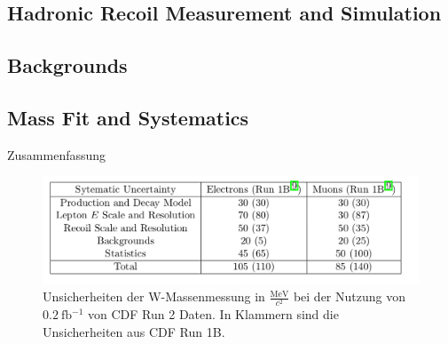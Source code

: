 \documentclass[aspectratio=1610, 9pt]{beamer}
\begin{document}
\subsection{Hadronic Recoil Measurement and Simulation}

\begin{frame}{}

\end{frame}

\subsection{Backgrounds}

\begin{frame}{}

\end{frame}

\subsection{Mass Fit and Systematics}

\begin{frame}{}

\end{frame}

\begin{frame}{Zusammenfassung}
  \begin{figure}
    \includegraphics[width=\textwidth]{images/unsicherheiten.png}
    \caption{Unsicherheiten der W-Massenmessung in $\frac{\si{\MeV}}{c^2}$ bei der Nutzung von $\SI{0,2}{\femto \barn^{-1}}$ von CDF Run 2 Daten. In Klammern sind die Unsicherheiten aus CDF Run 1B.}
  \end{figure}
\end{frame}




\end{document}
